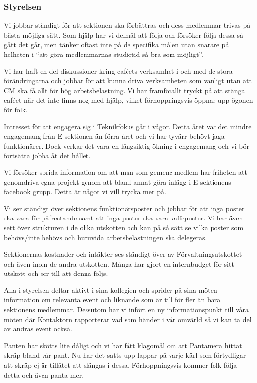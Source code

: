 \documentclass[../_main/handlingar.tex]{subfiles}
\begin{document}

\subsubsection*{Styrelsen}
Vi jobbar ständigt för att sektionen ska förbättras och dess medlemmar trivas på bästa möjliga sätt. Som hjälp har vi delmål att följa och försöker följa dessa så gått det går, men tänker oftast inte på de specifika målen utan snarare på helheten i “att göra medlemmarnas studietid så bra som möjligt”.

Vi har haft en del diskussioner kring caféets verksamhet i och med de stora förändringarna och jobbar för att kunna driva verksamheten som vanligt utan att CM ska få allt för hög arbetsbelastning. Vi har framförallt tryckt på att stänga caféet när det inte finns nog med hjälp, vilket förhoppningsvis öppnar upp ögonen för folk.

Intresset för att engagera sig i Teknikfokus går i vågor. Detta året var det mindre engagemang från E-sektionen än förra året och vi har tyvärr behövt jaga funktionärer. Dock verkar det vara en långsiktig ökning i engagemang och vi bör fortsätta jobba åt det hållet. 

Vi försöker sprida information om att man som gemene medlem har friheten att genomdriva egna projekt genom att bland annat göra inlägg i E-sektionens facebook grupp. Detta är något vi vill trycka mer på.

Vi ser ständigt över sektionens funktionärsposter och jobbar för att inga poster ska vara för påfrestande samt att inga poster ska vara kaffeposter. Vi har även sett över strukturen i de olika utskotten och kan på så sätt se vilka poster som behövs/inte behövs och huruvida arbetsbelastningen ska delegeras.

Sektionernas kostnader och intäkter ses ständigt över av Förvaltningsutskottet och även inom de andra utskotten. Många har gjort en internbudget för sitt utskott och ser till att denna följs.

Alla i styrelsen deltar aktivt i sina kollegien och sprider på sina möten information om relevanta event och liknande som är till för fler än bara sektionens medlemmar. Dessutom har vi infört en ny informationspunkt till våra möten där Kontaktorn rapporterar vad som händer i vår omvärld så vi kan ta del av andras event också.

Panten har skötts lite dåligt och vi har fått klagomål om att Pantamera hittat skräp bland vår pant. Nu har det satts upp lappar på varje kärl som förtydligar att skräp ej är tillåtet att slängas i dessa. Förhoppningsvis kommer folk följa detta och även panta mer.
\end{document}
